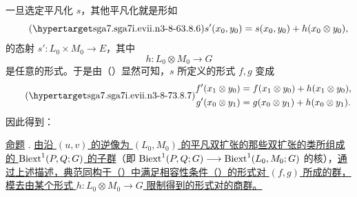 一旦选定平凡化 $s$，其他平凡化就是形如
\begin{equation}\tag{\SGARefTarget{sga7.sga7i.evii.n3-8-6}{3.8.6}}
 s'(x_0,y_0)=s(x_0,y_0)+h(x_0\otimes y_0),
\end{equation}
的态射 $s':L_0\times M_0\longrightarrow E$，其中
\[
 h:L_0\otimes M_0\longrightarrow G
\]
是任意的形式。于是由（）显然可知，$s$ 所定义的形式 $f,g$ 变成
\begin{equation}\tag{\SGARefTarget{sga7.sga7i.evii.n3-8-7}{3.8.7}}
\begin{aligned}
 f'(x_1\otimes y_0)&=f(x_1\otimes y_0)+h(x_1\otimes y_0),\\
 g'(x_0\otimes y_1)&=g(x_0\otimes y_1)+h(x_0\otimes y_1).
\end{aligned}
\end{equation}
因此得到：

\underline{命题} .
\underline{由沿 $(u,v)$ 的逆像为 $(L_0,M_0)$ 的平凡双扩张的那些双扩张的类所组成的 $\operatorname{Biext}^1(P,Q;G)$ 的子群}（即 $\operatorname{Biext}^1(P,Q;G)\longrightarrow\operatorname{Biext}^1(L_0,M_0;G)$ 的核），\underline{通过上述描述，典范同构于（）中满足相容性条件（）的形式对 $(f,g)$ 所成的群，模去由某个形式 $h:L_0\otimes M_0\longrightarrow G$ 限制得到的形式对的商群。}

